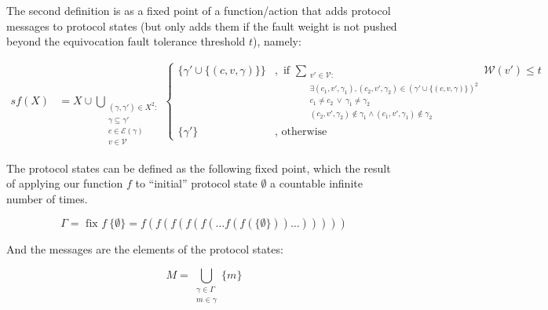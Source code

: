 The second definition is as a fixed point of a function/action that adds protocol messages to protocol states (but only adds them if the fault weight is not pushed beyond the equivocation fault tolerance threshold $t$), namely:

\begin{align}s
f(X) &= X \cup \bigcup_{\substack{(\gamma, \gamma') \in X^2 : \\ \gamma \subseteq \gamma' \\ c \in \mathcal{E}(\gamma) \\ v \in \mathcal{V}}}
\begin{cases}
      \{\gamma' \cup \{(c, v, \gamma)\} \} &, \text{ if } \sum_{ \substack{v' \in \mathcal{V} : \\ \exists (c_1 , v', \gamma_1), (c_2 , v', \gamma_2) \in (\gamma' \cup \{(c, v, \gamma)\})^2 \\ c_1 \neq c_2 ~ \lor ~ \gamma_1 \neq \gamma_2 \\  (c_2 , v', \gamma_2) \notin \gamma_1  \land (c_1 , v', \gamma_1) \notin \gamma_2}} \mathcal{W}(v') \leq t \\
      \{\gamma'\} &, \text{ otherwise }
\end{cases}
\end{align}

The protocol states can be defined as the following fixed point, which the result of applying our function $f$ to ``initial'' protocol state $\emptyset$ a countable infinite number of times.

\[
\Gamma = \text{ fix } f ~ \{\emptyset\} = f(f(f(f(f(\dots f(f(\{\emptyset\}))\dots)))))
\]

And the messages are the elements of the protocol states:

\[
M = \bigcup_{\substack{\gamma \in \Gamma \\ m \in \gamma}} \{m\}
\]
